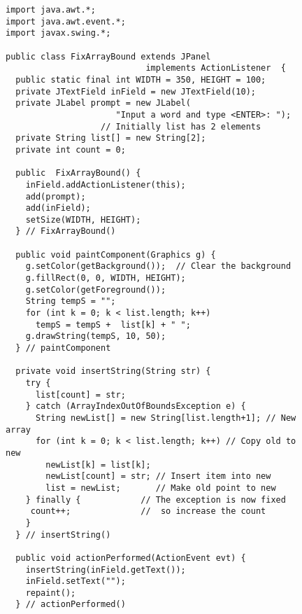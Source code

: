 \begin{figure}[p]
\jjjprogstart
\begin{jjjlisting}[29pc]
\begin{lstlisting}
import java.awt.*;
import java.awt.event.*;
import javax.swing.*;

public class FixArrayBound extends JPanel 
                            implements ActionListener  {
  public static final int WIDTH = 350, HEIGHT = 100;
  private JTextField inField = new JTextField(10);
  private JLabel prompt = new JLabel(
                      "Input a word and type <ENTER>: ");
                   // Initially list has 2 elements
  private String list[] = new String[2]; 
  private int count = 0;

  public  FixArrayBound() {
    inField.addActionListener(this);
    add(prompt);
    add(inField);
    setSize(WIDTH, HEIGHT);
  } // FixArrayBound()

  public void paintComponent(Graphics g) {
    g.setColor(getBackground());  // Clear the background
    g.fillRect(0, 0, WIDTH, HEIGHT);
    g.setColor(getForeground());
    String tempS = "";
    for (int k = 0; k < list.length; k++)
      tempS = tempS +  list[k] + " ";
    g.drawString(tempS, 10, 50);
  } // paintComponent

  private void insertString(String str) {
    try {
      list[count] = str;
    } catch (ArrayIndexOutOfBoundsException e) {
      String newList[] = new String[list.length+1]; // New array
      for (int k = 0; k < list.length; k++) // Copy old to new
        newList[k] = list[k];
        newList[count] = str; // Insert item into new
        list = newList;       // Make old point to new
    } finally {            // The exception is now fixed
     count++;              //  so increase the count
    }
  } // insertString()

  public void actionPerformed(ActionEvent evt) {
    insertString(inField.getText());
    inField.setText("");
    repaint();
  } // actionPerformed()
\end{lstlisting}
\end{jjjlisting}
\end{figure}


